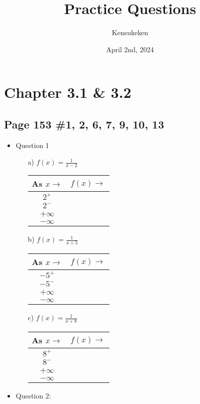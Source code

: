 \documentclass{article}
\title{Practice Questions}
\author{Kensukeken}
\date{April 2nd, 2024}
\begin{document}
\maketitle
\section*{Chapter 3.1 \& 3.2}
\subsection*{Page 153 \#1, 2, 6, 7, 9, 10, 13}
\begin{itemize}
\item Question 1
\begin{enumerate}
    \item[a)] $f(x)=\frac{1}{x-2}$
\begin{tabular}{|c|c|}
    \hline
    \textbf{As $x \to$} & \textbf{$f(x) \to$} \\
    \hline
    $2^+$ & \\
    \hline
    $2^-$ & \\
    \hline
    $+\infty$ & \\
    \hline
    $-\infty$ & \\
    \hline
\end{tabular}
    \item[b)] $f(x)=\frac{1}{x+5}$
\begin{tabular}{|c|c|}
    \hline
    \textbf{As $x \to$} & \textbf{$f(x) \to$} \\
    \hline
    $-5^+$ & \\
    \hline
    $-5^-$ & \\
    \hline
    $+\infty$ & \\
    \hline
    $-\infty$ & \\
    \hline
\end{tabular}
    \item[c)] $f(x)=\frac{1}{x+8}$
\begin{tabular}{|c|c|}
    \hline
    \textbf{As $x \to$} & \textbf{$f(x) \to$} \\
    \hline
    $8^+$ & \\
    \hline
    $8^-$ & \\
    \hline
    $+\infty$ & \\
    \hline
    $-\infty$ & \\
    \hline
\end{tabular}
\end{enumerate}
\item Question 2: 
\begin{enumerate}

\end{enumerate}
\end{itemize}
\end{document}
